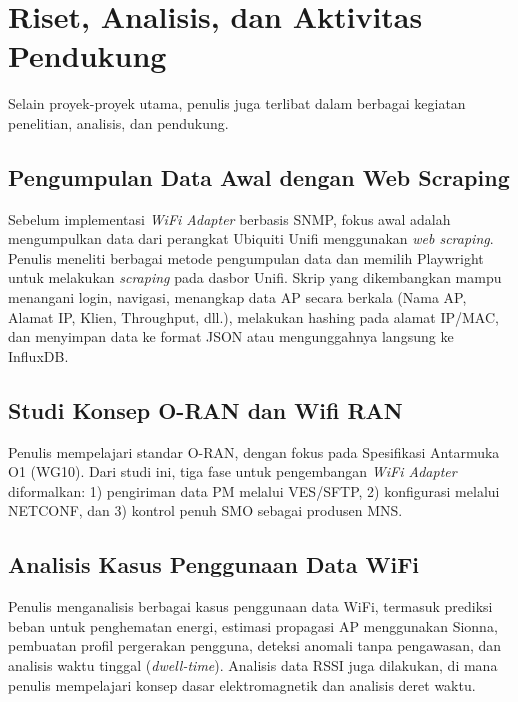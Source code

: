 \section{Riset, Analisis, dan Aktivitas Pendukung}
Selain proyek-proyek utama, penulis juga terlibat dalam berbagai kegiatan penelitian, analisis, dan pendukung.

\subsection{Pengumpulan Data Awal dengan Web Scraping}

Sebelum implementasi \textit{WiFi Adapter} berbasis SNMP, fokus awal adalah mengumpulkan data dari perangkat Ubiquiti Unifi menggunakan \textit{web scraping}. Penulis meneliti berbagai metode pengumpulan data dan memilih Playwright untuk melakukan \textit{scraping} pada dasbor Unifi. Skrip yang dikembangkan mampu menangani login, navigasi, menangkap data AP secara berkala (Nama AP, Alamat IP, Klien, Throughput, dll.), melakukan hashing pada alamat IP/MAC, dan menyimpan data ke format JSON atau mengunggahnya langsung ke InfluxDB.


\subsection{Studi Konsep O-RAN dan Wifi RAN}
Penulis mempelajari standar O-RAN, dengan fokus pada Spesifikasi Antarmuka O1 (WG10). Dari studi ini, tiga fase untuk pengembangan \textit{WiFi Adapter} diformalkan: 1) pengiriman data PM melalui VES/SFTP, 2) konfigurasi melalui NETCONF, dan 3) kontrol penuh SMO sebagai produsen MNS.

\subsection{Analisis Kasus Penggunaan Data WiFi}
Penulis menganalisis berbagai kasus penggunaan data WiFi, termasuk prediksi beban untuk penghematan energi, estimasi propagasi AP menggunakan Sionna, pembuatan profil pergerakan pengguna, deteksi anomali tanpa pengawasan, dan analisis waktu tinggal (\textit{dwell-time}). Analisis data RSSI juga dilakukan, di mana penulis mempelajari konsep dasar elektromagnetik dan analisis deret waktu.

